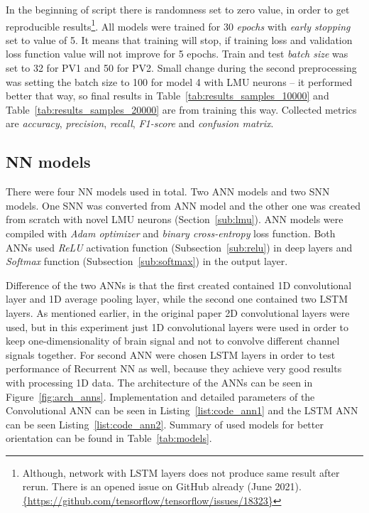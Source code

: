 In the beginning of script there is randomness set to zero value, in order to get reproducible results\footnote{Although, network with LSTM layers does not produce same result after rerun. There is an opened issue on GitHub already (June 2021). \url{{https://github.com/tensorflow/tensorflow/issues/18323}}}. All models were trained for 30 \textit{epochs} with \textit{early stopping} set to value of 5. It means that training will stop, if training loss and validation loss function value will not improve for 5 epochs. Train and test \textit{batch size} was set to 32 for PV1 and 50 for PV2. Small change during the second preprocessing was setting the batch size to 100 for model 4 with LMU neurons -- it performed better that way, so final results in Table~\ref{tab:results_samples_10000} and Table~\ref{tab:results_samples_20000} are from training this way. Collected metrics are \textit{accuracy}, \textit{precision}, \textit{recall}, \textit{F1-score} and \textit{confusion matrix}.

%
%

\subsection{NN models}%
\label{sub:nn_models}

There were four NN models used in total. Two ANN models and two SNN models. One SNN was converted from ANN model and the other one was created from scratch with novel LMU neurons (Section~\ref{sub:lmu}). ANN models were compiled with \textit{Adam optimizer} and \textit{binary cross-entropy} loss function. Both ANNs used \textit{ReLU} activation function (Subsection~\ref{sub:relu}) in deep layers and \textit{Softmax} function (Subsection~\ref{sub:softmax}) in the output layer.

Difference of the two ANNs is that the first created contained 1D convolutional layer and 1D average pooling layer, while the second one contained two LSTM layers. As mentioned earlier, in the original paper \cite{varekap300} 2D convolutional layers were used, but in this experiment just 1D convolutional layers were used in order to keep one-dimensionality of brain signal and not to convolve different channel signals together. For second ANN were chosen LSTM layers in order to test performance of Recurrent NN as well, because they achieve very good results with processing 1D data. The architecture of the ANNs can be seen in Figure~\ref{fig:arch_anns}. Implementation and detailed parameters of the Convolutional ANN can be seen in Listing~\ref{list:code_ann1} and the LSTM ANN can be seen Listing~\ref{list:code_ann2}. Summary of used models for better orientation can be found in Table~\ref{tab:models}.

